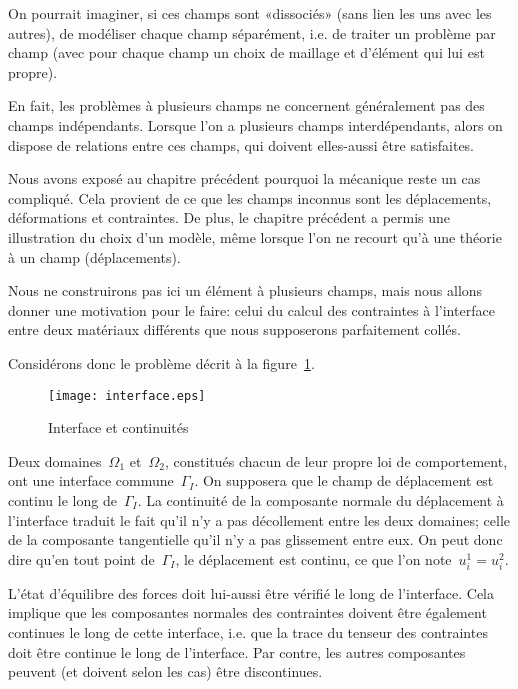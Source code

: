 On pourrait imaginer, si ces champs sont «dissociés» (sans lien les uns avec les autres), de modéliser chaque champ séparément, i.e. de traiter un problème par champ (avec pour chaque champ un choix de maillage et d'élément qui lui est propre).

En fait, les problèmes à plusieurs champs ne concernent généralement pas des champs indépendants. Lorsque l'on a plusieurs champs interdépendants, alors on dispose de relations entre ces champs, qui doivent elles-aussi être satisfaites.

\medskip
Nous avons exposé au chapitre précédent pourquoi la mécanique reste un cas compliqué. Cela provient de ce que les champs inconnus sont les déplacements, déformations et contraintes. De plus, le chapitre précédent a permis une illustration du choix d'un modèle, même lorsque l'on ne recourt qu'à une théorie à un champ (déplacements).

Nous ne construirons pas ici un élément à plusieurs champs, mais nous allons donner une motivation pour le faire: celui du calcul des contraintes à l'interface entre deux matériaux différents que nous supposerons parfaitement collés.

\medskip
Considérons donc le problème décrit à la figure~\ref{interf}.
\begin{figure}[h!]
\centering
\texttt{[image: interface.eps]}
\caption{Interface et continuités}\label{interf}
\end{figure}
Deux domaines~$\Omega_1$ et~$\Omega_2$, constitués chacun de leur propre loi de comportement, ont une interface commune~$\Gamma_I$. On supposera que le champ de déplacement est continu le long de~$\Gamma_I$. La continuité de la composante normale du déplacement à l'interface traduit le fait qu'il n'y a pas décollement entre les deux domaines; celle de la composante tangentielle qu'il n'y a pas glissement entre eux.
On peut donc dire qu'en tout point de~$\Gamma_I$, le déplacement est continu, ce que l'on note~$u_i^1=u_i^2$.

\medskip
L'état d'équilibre des forces doit lui-aussi être vérifié le long de l'interface. Cela implique que les composantes normales des contraintes doivent être également continues le long de cette interface, i.e. que la trace du tenseur des contraintes doit être continue le long de l'interface. Par contre, les autres composantes peuvent (et doivent selon les cas) être discontinues.

